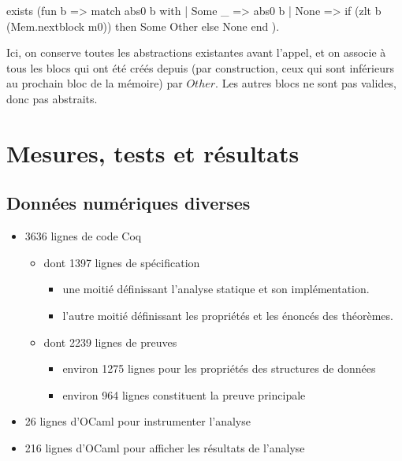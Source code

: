 \documentclass{article}
\begin{document}
\begin{coq}
exists (fun b =>
  match abs0 b with
  | Some _ => abs0 b
  | None   => if (zlt b (Mem.nextblock m0)) then Some Other else None
  end
).
\end{coq}

Ici, on conserve toutes les abstractions existantes avant l'appel, et on
associe à tous les blocs qui ont été créés depuis (par construction, ceux qui
sont inférieurs au prochain bloc de la mémoire) par $Other$. Les
autres blocs ne sont pas valides, donc pas abstraits.

\newpage
\section{Mesures, tests et résultats}

\subsection{Données numériques diverses}

\begin{itemize}

\item 3636 lignes de code Coq

\begin{itemize}

\item dont 1397 lignes de spécification

\begin{itemize}

\item une moitié définissant l'analyse statique et son implémentation.

\item l'autre moitié définissant les propriétés et les énoncés des théorèmes.

\end{itemize}

\item dont 2239 lignes de preuves

\begin{itemize}

\item environ 1275 lignes pour les propriétés des structures de données

\item environ 964 lignes constituent la preuve principale

\end{itemize}

\end{itemize}

\item 26 lignes d'OCaml pour instrumenter l'analyse

\item 216 lignes d'OCaml pour afficher les résultats de l'analyse

\end{itemize}
\end{document}
